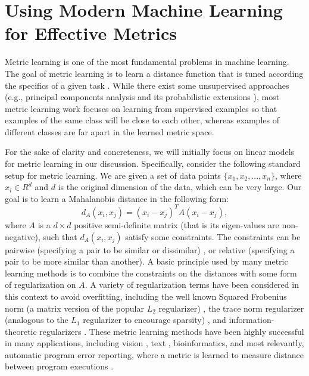 \section{Using Modern Machine Learning for Effective Metrics}
Metric learning is one of the most fundamental problems in machine
learning. The goal of metric learning is to learn a distance function
that is tuned according the specifics of a given task
\cite{kulis2012metric}. While there exist some unsupervised
approaches (e.g., principal components analysis and its probabilistic
extensions \cite{scholkopf1998nonlinear,tipping1999probabilistic}),
most metric learning work focuses on learning from supervised examples
so that examples of the same class will be close to each other,
whereas examples of different classes are far apart in the learned
metric space.

For the sake of clarity and concreteness, we will initially focus on
linear models for metric learning in our discussion. Specifically,
consider the following standard setup for metric learning. We are
given a set of data points $\{x_1, x_2, ...,x_n\}$, where $x_i \in
R^d$ and $d$ is the original dimension of the data, which can be very
large. Our goal is to learn a Mahalanobis distance in the following
form: \[d_A(x_i, x_j) = (x_i-x_j)^TA(x_i-x_j),\] where $A$ is a
$d\times d$ positive semi-definite matrix (that is its eigen-values
are non-negative), such that $d_A(x_i, x_j)$ satisfy some
constraints. The constraints can be pairwise (specifying a pair to be
similar or dissimilar)
\cite{xing2002distance,bilenko2004integrating,davis2007information},
or relative (specifying a pair to be more similar than
another)\cite{schultz2004learning,rosales2006learning}.  A basic
principle used by many metric learning methods is to combine the
constraints on the distances with some form of regularization on
$A$. A variety of regularization terms have been considered in this
context to avoid overfitting, including the well known Squared
Frobenius norm (a matrix version of the popular $L_2$ regularizer)
\cite{schultz2004learning,kwok2003learning}, the trace norm
regularizer (analogous to the $L_1$ regularizer to encourage sparsity)
\cite{jain2010inductive}, and information-theoretic regularizers
\cite{davis2007information}. These metric learning methods have been
highly successful in many applications, including vision
\cite{hoi2006learning,frome2007learning,guillaumin2009you}, text
\cite{davis2008structured}, bioinformatics\cite{xiong2006kernel}, and
most relevantly, automatic program error reporting, where a metric is
learned to measure distance between program executions
\cite{davis2007information,HaClarify}.

